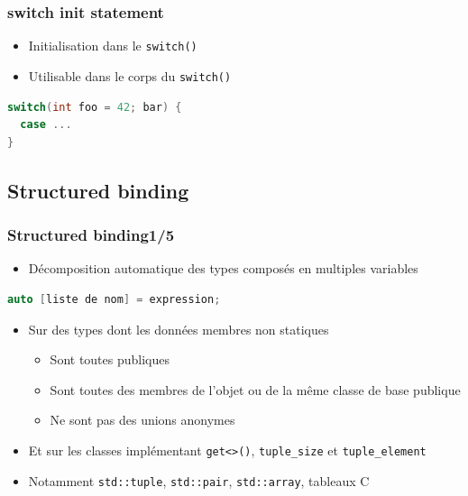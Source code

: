 \documentclass[C++.tex]{subfiles}
\begin{document}
\begin{frame}[fragile]
	\frametitle{switch init statement}
	\begin{itemize}
		\item Initialisation dans le \lstinline|switch()|
		\item Utilisable dans le corps du \lstinline|switch()|
	\end{itemize}

	\begin{lstlisting}[language=C++]
switch(int foo = 42; bar) {
  case ...
}\end{lstlisting}
\end{frame}

\subsection*{Structured binding}
\begin{frame}[fragile]
	\frametitle{Structured binding\titlehfill{}1/5}
	\begin{itemize}
		\item Décomposition automatique des types composés en multiples variables
	\end{itemize}

	\begin{lstlisting}[language=C++]
auto [liste de nom] = expression;\end{lstlisting}

	\begin{itemize}
		\item Sur des types dont les données membres non statiques
		\begin{itemize}
			\item Sont toutes publiques
			\item Sont toutes des membres de l'objet ou de la même classe de base publique
			\item Ne sont pas des unions anonymes
		\end{itemize}

		\item Et sur les classes implémentant \lstinline|get<>()|, \lstinline|tuple_size| et \lstinline|tuple_element|	
		
		\item Notamment \lstinline|std::tuple|, \lstinline|std::pair|, \lstinline|std::array|, tableaux C
	\end{itemize}
\end{frame}
\end{document}
